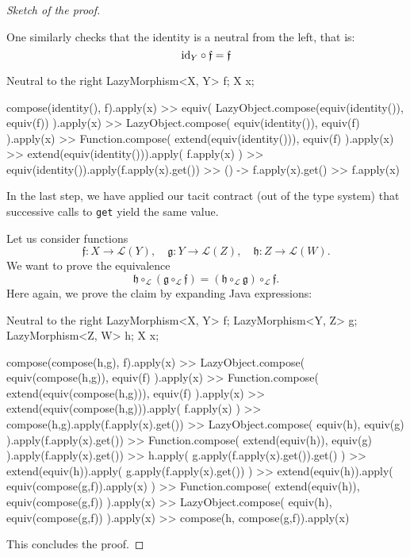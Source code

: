 \documentclass[12pt,a4paper]{report}
\renewcommand{\baselinestretch}{1.5}
\theoremstyle{theorem}
\theoremstyle{definition}
\begin{document}
\begin{proof}[Sketch of the proof]
\begin{description}
\renewcommand{\baselinestretch}{1.5} 
\selectfont

	One similarly checks that the identity is a neutral from the left,
	that is:	
		\[ {\rm id}_Y \circ \mathfrak{f} = \mathfrak{f} \]
		
\renewcommand{\baselinestretch}{1} 
\selectfont

\begin{javacode}{Neutral to the right}
LazyMorphism<X, Y> f;
X x;

compose(identity(), f).apply(x)
 >> equiv(
      LazyObject.compose(equiv(identity()), equiv(f))
    ).apply(x)
 >> LazyObject.compose(
      equiv(identity()), equiv(f)
    ).apply(x)
 >> Function.compose(
      extend(equiv(identity())), equiv(f)
    ).apply(x)
 >> extend(equiv(identity())).apply(
      f.apply(x)
    )
 >> equiv(identity()).apply(f.apply(x).get())
 >> () -> f.apply(x).get()
 >> f.apply(x)
\end{javacode}

\renewcommand{\baselinestretch}{1.5} 
\selectfont
In the last step, we have applied our tacit contract (out of the type system)
that successive calls to \lstinline{get}{} yield the same value.

	\item[Associativity of the composition]
	Let us consider functions
		\[ \mathfrak{f}:X\to\mathcal{L}(Y),
			\quad \mathfrak{g}:Y\to\mathcal{L}(Z),
			\quad \mathfrak{h}:Z\to \mathcal{L}(W) .\]
	We want to prove the equivalence
		\[ \mathfrak{h}\circ_{\mathscr{L}}
			(\mathfrak{g}\circ_{\mathscr{L}}\mathfrak{f})
		= (\mathfrak{h}\circ_{\mathscr{L}}\mathfrak{g})
			\circ_{\mathscr{L}}\mathfrak{f} .\]
	Here again, we prove the claim by expanding Java expressions:

\renewcommand{\baselinestretch}{1} 
\selectfont

\begin{javacode}{Neutral to the right}
LazyMorphism<X, Y> f;
LazyMorphism<Y, Z> g;
LazyMorphism<Z, W> h;
X x;

compose(compose(h,g), f).apply(x)
 >> LazyObject.compose(
      equiv(compose(h,g)), equiv(f)
    ).apply(x)
 >> Function.compose(
      extend(equiv(compose(h,g))), equiv(f)
    ).apply(x)
 >> extend(equiv(compose(h,g))).apply(
      f.apply(x)
    )
 >> compose(h,g).apply(f.apply(x).get())
 >> LazyObject.compose(
      equiv(h), equiv(g)
    ).apply(f.apply(x).get())
 >> Function.compose(
      extend(equiv(h)), equiv(g)
    ).apply(f.apply(x).get())
 >> h.apply(
      g.apply(f.apply(x).get()).get()
    )
 >> extend(equiv(h)).apply(
      g.apply(f.apply(x).get())
    )
 >> extend(equiv(h)).apply(
      equiv(compose(g,f)).apply(x)
    )
 >> Function.compose(
      extend(equiv(h)), equiv(compose(g,f))
    ).apply(x)
 >> LazyObject.compose(
      equiv(h), equiv(compose(g,f))
    ).apply(x) 
 >> compose(h, compose(g,f)).apply(x)
\end{javacode}

\renewcommand{\baselinestretch}{1.5} 
\selectfont

\end{description}
This concludes the proof.
\end{proof}
\end{document}
